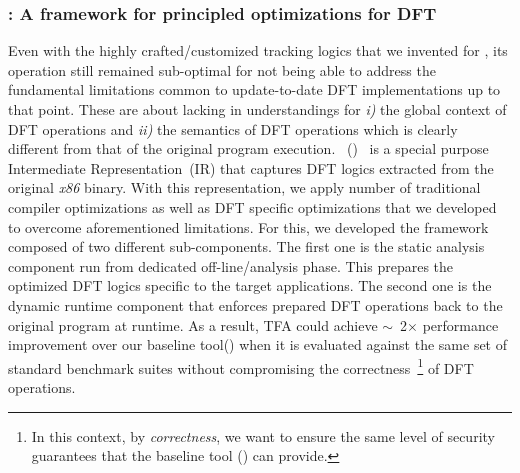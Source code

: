 \documentclass[letterpaper, 10pt]{article}
\begin{document}
\begin{small}
\subsubsection*{\TFA: A framework for principled optimizations for DFT}

Even with the highly crafted/customized tracking logics that we invented for
\libdft, its operation still remained sub-optimal for not being able to address
the fundamental limitations common to update-to-date DFT implementations up to
that point. These are about lacking in understandings for {\it i)} the global
context of DFT operations and {\it ii)} the semantics of DFT operations which
is clearly different from that of the original program execution.
%
\TFAFull~(\TFA)~\cite{tfa:2012ndss} is a special purpose Intermediate
Representation~(IR) that captures DFT logics extracted from the original {\it
x86} binary. With this representation, we apply number of traditional compiler
optimizations as well as DFT specific optimizations that we developed to
overcome aforementioned limitations.
%
For this, we developed the framework composed of two different sub-components.
The first one is the static analysis component run from dedicated
off-line/analysis phase. This prepares the optimized DFT logics specific to the
target applications. The second one is the dynamic runtime component that
enforces prepared DFT operations back to the original program at runtime.
%
%
As a result, TFA could achieve \(\sim\)~2\(\times\) performance improvement
over  our baseline tool(\libdft) when it is evaluated against the same set of
standard benchmark suites without compromising the correctness~\footnote{In
        this context, by {\it correctness}, we want to ensure the same level of
security guarantees that the baseline tool (\libdft) can provide.} of DFT
operations.


\end{small}
\end{document}
